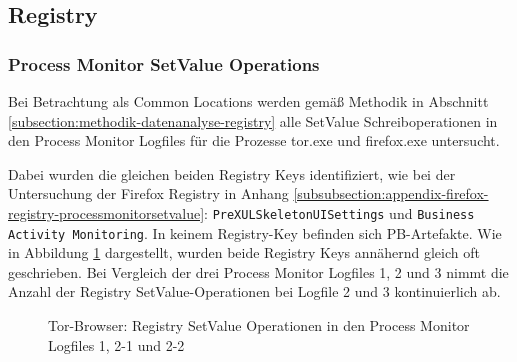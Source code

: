 \begin{appendices}
\subsection{Registry}

\subsubsection*{Process Monitor SetValue Operations}

Bei Betrachtung als Common Locations werden gemäß Methodik in Abschnitt \ref{subsection:methodik-datenanalyse-registry} alle \glqq{}SetValue\grqq{} Schreiboperationen in den Process Monitor Logfiles für die Prozesse \glqq{}tor.exe\grqq{} und \glqq{}firefox.exe\grqq{} untersucht. 

Dabei wurden die gleichen beiden Registry Keys identifiziert, wie bei der Untersuchung der Firefox Registry in Anhang \ref{subsubsection:appendix-firefox-registry-processmonitorsetvalue}: \texttt{PreXULSkeletonUISettings} und \texttt{Business Activity Monitoring}. In keinem Registry-Key befinden sich PB-Artefakte.
Wie in Abbildung \ref{chart:tor-registy-css-vs-bam} dargestellt, wurden beide Registry Keys annähernd gleich oft geschrieben. Bei Vergleich der drei Process Monitor Logfiles 1, 2 und 3 nimmt die Anzahl der Registry \glqq{}SetValue\grqq{}-Operationen bei Logfile 2 und 3 kontinuierlich ab.

\begin{figure}[h!]
	\caption{Tor-Browser: Registry \glqq{}SetValue\grqq{} Operationen in den Process Monitor Logfiles 1, 2-1 und 2-2}
	\label{chart:tor-registy-css-vs-bam}
\end{figure}


\end{appendices}
